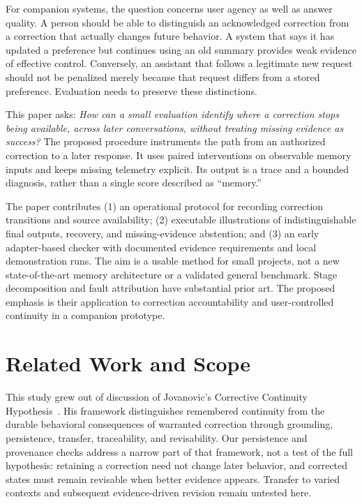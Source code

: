 \documentclass[runningheads]{llncs}
\begin{document}
For companion systems, the question concerns user agency as well as answer quality. A person should be able to distinguish an acknowledged correction from a correction that actually changes future behavior. A system that says it has updated a preference but continues using an old summary provides weak evidence of effective control. Conversely, an assistant that follows a legitimate new request should not be penalized merely because that request differs from a stored preference. Evaluation needs to preserve these distinctions.

This paper asks: \emph{How can a small evaluation identify where a correction stops being available, across later conversations, without treating missing evidence as success?} The proposed procedure instruments the path from an authorized correction to a later response. It uses paired interventions on observable memory inputs and keeps missing telemetry explicit. Its output is a trace and a bounded diagnosis, rather than a single score described as ``memory.''

The paper contributes (1) an operational protocol for recording correction transitions and source availability; (2) executable illustrations of indistinguishable final outputs, recovery, and missing-evidence abstention; and (3) an early adapter-based checker with documented evidence requirements and local demonstration runs. The aim is a usable method for small projects, not a new state-of-the-art memory architecture or a validated general benchmark. Stage decomposition and fault attribution have substantial prior art. The proposed emphasis is their application to correction accountability and user-controlled continuity in a companion prototype.

\section{Related Work and Scope}
This study grew out of discussion of Jovanovic's Corrective Continuity Hypothesis~\cite{jovanovic}. His framework distinguishes remembered continuity from the durable behavioral consequences of warranted correction through grounding, persistence, transfer, traceability, and revisability. Our persistence and provenance checks address a narrow part of that framework, not a test of the full hypothesis: retaining a correction need not change later behavior, and corrected states must remain revisable when better evidence appears. Transfer to varied contexts and subsequent evidence-driven revision remain untested here.
\end{document}
